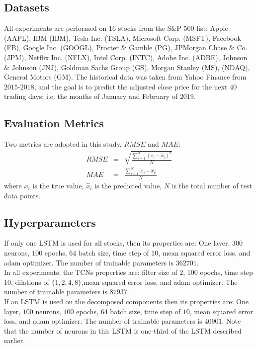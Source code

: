 \documentclass[12pt, A4]{article}
\begin{document}
\subsection{Datasets}
 All experiments are performed on $16$ stocks from the S$\&$P $500$ list: Apple (AAPL), IBM (IBM), Tesla Inc. (TSLA), Microsoft Corp. (MSFT), Facebook (FB), Google Inc. (GOOGL), Procter $\&$ Gamble (PG), JPMorgan Chase $\&$ Co. (JPM), Netflix Inc. (NFLX), Intel Corp. (INTC), Adobe Inc. (ADBE), Johnson $\&$ Johnson (JNJ), Goldman Sachs Group (GS), Morgan Stanley (MS), (NDAQ), General Motors (GM). The historical data was taken from Yahoo Finance from $2015$-$2018$, and the goal is to predict the adjusted close price for the next $40$ trading days; i.e. the months of January and February of $2019$. 

\subsection{Evaluation Metrics}
Two metrics are adopted in this study, $RMSE$ and $MAE$:
\begin{eqnarray}
	RMSE &=& \sqrt{\frac{\sum_{i=1}^{N}(x_{i} - \hat{x}_{i})^{2} }{N} } \label{RMSE} \\
	MAE &=& \frac{\sum_{i=1}^{N} |x_{i} - \hat{x}_{i}| }{N} \label{MAE}
\end{eqnarray}
where $x_{i}$ is the true value, $\hat{x}_{i}$ is the predicted value, $N$ is the total number of test data points. 

\subsection{Hyperparameters}

If only one LSTM is used for all stocks, then its properties are: One layer, $300$ neurons, $100$ epochs, $64$ batch size, time step of $10$, mean squared error loss, and adam optimizer. The number of trainable parameters is $362701$. \\

In all experiments, the TCNs properties are: filter size of $2$, $100$ epochs, time step $10$, dilations of $\{1,2,4,8\}$,mean squared error loss, and adam optimizer.  The number of trainable parameters is $87937$. \\

If an LSTM is used on the decomposed components then its properties are: One layer, $100$ neurons, $100$ epochs, $64$ batch size, time step of $10$, mean squared error loss, and adam optimizer. The number of trainable parameters is $40901$.  Note that the number of neurons in this LSTM is one-third of the LSTM described earlier. 
\end{document}
